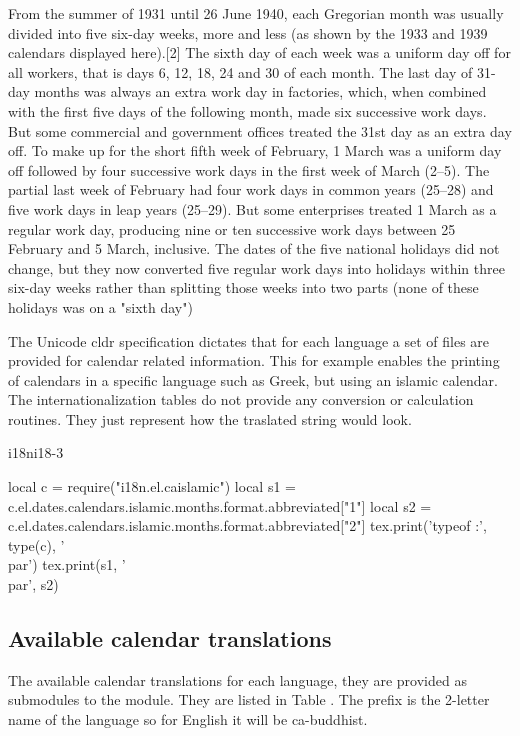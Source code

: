 From the summer of 1931 until 26 June 1940, each Gregorian month was usually divided into five six-day weeks, more and less (as shown by the 1933 and 1939 calendars displayed here).[2] The sixth day of each week was a uniform day off for all workers, that is days 6, 12, 18, 24 and 30 of each month. 
The last day of 31-day months was always an extra work day in factories, which, when combined with the first five days of the following month, made six successive work days. But some commercial and government offices treated the 31st day as an extra day off. To make up for the short fifth week of February, 1 March was a uniform day off followed by four successive work days in the first week of March (2–5). The partial last week of February had four work days in common years (25–28) and five work days in leap years (25–29). But some enterprises treated 1 March as a regular work day, producing nine or ten successive work days between 25 February and 5 March, inclusive. The dates of the five national holidays did not change, but they now converted five regular work days into holidays within three six-day weeks rather than splitting those weeks into two parts (none of these holidays was on a "sixth day")


The Unicode cldr specification dictates that for each language a set of files are provided for calendar related information. This for example enables the printing of calendars in a specific language such as Greek, but using an islamic calendar.  The internationalization tables do not provide any conversion or calculation routines. They just represent how the traslated string would look. 

\begin{texexample}{i18n}{i18-3}
\begin{luacode}
local c = require("i18n.el.caislamic")
local s1 = c.el.dates.calendars.islamic.months.format.abbreviated["1"]
local s2 = c.el.dates.calendars.islamic.months.format.abbreviated["2"]
tex.print('typeof :', type(c), '\\par')
tex.print(s1, '\\par', s2)
\end{luacode}
\end{texexample}

\subsection{Available calendar translations}

The available calendar translations for each language, they are provided as submodules to the  module. They are listed in Table    . The prefix is the 2-letter name of the language so for English it will be ca-buddhist.

